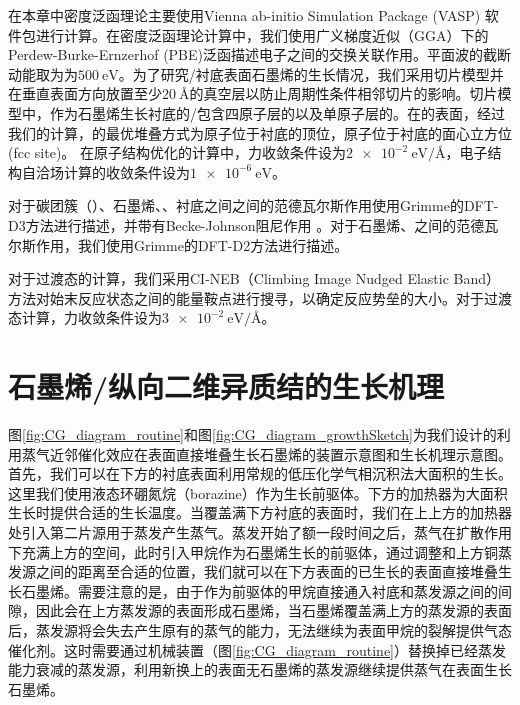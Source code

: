 在本章中密度泛函理论主要使用Vienna ab-initio Simulation Package (VASP) 软件包进行计算。在密度泛函理论计算中，我们使用广义梯度近似（GGA）下的 Perdew-Burke-Ernzerhof (PBE)泛函描述电子之间的交换关联作用。平面波的截断动能取为为$\SI{500}{\electronvolt}$。为了研究/衬底表面石墨烯的生长情况，我们采用切片模型并在垂直表面方向放置至少$\SI{20}{\angstrom}$的真空层以防止周期性条件相邻切片的影响。切片模型中，作为石墨烯生长衬底的/包含四原子层的以及单原子层的。在的表面，经过我们的计算，的最优堆叠方式为原子位于衬底的顶位，原子位于衬底的面心立方位(fcc site)。
在原子结构优化的计算中，力收敛条件设为$\SI{2e-2}{\electronvolt \per \angstrom}$，电子结构自洽场计算的收敛条件设为$\SI{1e-6}{\electronvolt}$。

对于碳团簇（）、石墨烯、、衬底之间之间的范德瓦尔斯作用使用Grimme的DFT-D3方法进行描述，并带有Becke-Johnson阻尼作用 。对于石墨烯、之间的范德瓦尔斯作用，我们使用Grimme的DFT-D2方法进行描述。

对于过渡态的计算，我们采用CI-NEB（Climbing Image Nudged Elastic Band）方法对始末反应状态之间的能量鞍点进行搜寻，以确定反应势垒的大小。对于过渡态计算，力收敛条件设为$\SI{3e-2}{\electronvolt \per \angstrom}$。

\section{石墨烯/纵向二维异质结的生长机理}
    \label{cap:CG}
    图\ref{fig:CG_diagram_routine}和图\ref{fig:CG_diagram_growthSketch}为我们设计的利用蒸气近邻催化效应在表面直接堆叠生长石墨烯的装置示意图和生长机理示意图。首先，我们可以在下方的衬底表面利用常规的低压化学气相沉积法大面积的生长。这里我们使用液态环硼氮烷（borazine）作为生长前驱体。下方的加热器为大面积生长时提供合适的生长温度。当覆盖满下方衬底的表面时，我们在上上方的加热器处引入第二片源用于蒸发产生蒸气。蒸发开始了额一段时间之后，蒸气在扩散作用下充满上方的空间，此时引入甲烷作为石墨烯生长的前驱体，通过调整和上方铜蒸发源之间的距离至合适的位置，我们就可以在下方表面的已生长的表面直接堆叠生长石墨烯。需要注意的是，由于作为前驱体的甲烷直接通入衬底和蒸发源之间的间隙，因此会在上方蒸发源的表面形成石墨烯，当石墨烯覆盖满上方的蒸发源的表面后，蒸发源将会失去产生原有的蒸气的能力，无法继续为表面甲烷的裂解提供气态催化剂。这时需要通过机械装置（图\ref{fig:CG_diagram_routine}）替换掉已经蒸发能力衰减的蒸发源，利用新换上的表面无石墨烯的蒸发源继续提供蒸气在表面生长石墨烯。

